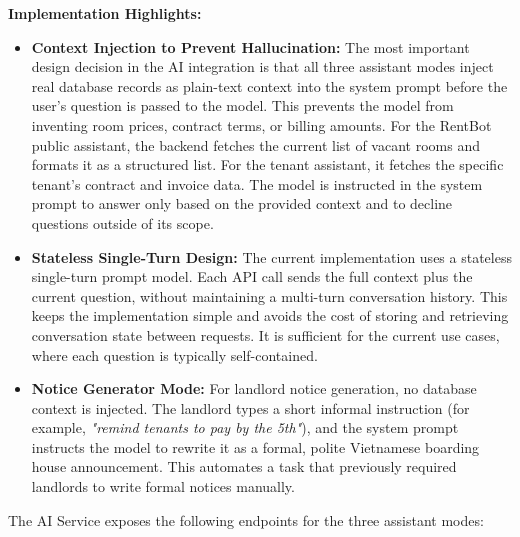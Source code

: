 \textbf{Implementation Highlights:}
\begin{itemize}
    \item \textbf{Context Injection to Prevent Hallucination:} The most important design decision in the AI integration is that all three assistant modes inject real database records as plain-text context into the system prompt before the user's question is passed to the model. This prevents the model from inventing room prices, contract terms, or billing amounts. For the RentBot public assistant, the backend fetches the current list of vacant rooms and formats it as a structured list. For the tenant assistant, it fetches the specific tenant's contract and invoice data. The model is instructed in the system prompt to answer only based on the provided context and to decline questions outside of its scope.
    \item \textbf{Stateless Single-Turn Design:} The current implementation uses a stateless single-turn prompt model. Each API call sends the full context plus the current question, without maintaining a multi-turn conversation history. This keeps the implementation simple and avoids the cost of storing and retrieving conversation state between requests. It is sufficient for the current use cases, where each question is typically self-contained.
    \item \textbf{Notice Generator Mode:} For landlord notice generation, no database context is injected. The landlord types a short informal instruction (for example, \textit{"remind tenants to pay by the 5th"}), and the system prompt instructs the model to rewrite it as a formal, polite Vietnamese boarding house announcement. This automates a task that previously required landlords to write formal notices manually.
\end{itemize}

The AI Service exposes the following endpoints for the three assistant modes:

